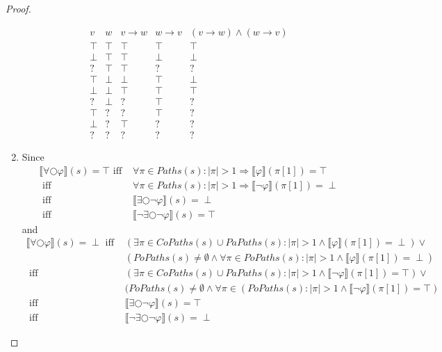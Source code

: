 \documentclass[12pt]{article}
\newcommand{\nxt}{\bigcirc}
\theoremstyle{definition}
\newcommand{\satisfaction}[1]{\llbracket #1 \rrbracket}
\begin{document}
\begin{proof}
\begin{enumerate}
\[
\begin{array}{ll|ll|l}
v     & w     & v \rightarrow w & w \rightarrow v & (v \rightarrow w) \wedge (w \rightarrow v)\\\hline
\top  & \top  & \top  & \top  & \top\\
\perp & \top  & \top  & \perp & \perp\\
?     & \top  & \top  & ?     & ?\\
\top  & \perp & \perp & \top  & \perp\\
\perp & \perp & \top  & \top  & \top\\
?     & \perp & ?     & \top  & ?\\
\top  & ?     & ?     & \top  & ?\\
\perp & ?     & \top  & ?     & ?\\
?     & ?     & ?     & ?     & ?
\end{array}
\]
\item
Since
\begin{align*}
\satisfaction{\forall \nxt \varphi}(s) = \top
\mbox{ iff } & \forall \pi \in \mathit{Paths}(s) : |\pi| > 1 \Rightarrow \satisfaction{\varphi}(\pi[1]) = \top\\
\mbox{ iff } & \forall \pi \in \mathit{Paths}(s) : |\pi| > 1 \Rightarrow \satisfaction{\neg \varphi}(\pi[1]) = \perp\\
\mbox{ iff } & \satisfaction{\exists \nxt \neg \varphi}(s) = \perp\\
\mbox{ iff } & \satisfaction{\neg \exists \nxt \neg \varphi}(s) = \top
\end{align*}
and
\begin{align*}
\satisfaction{\forall \nxt \varphi}(s) = \perp
\mbox{ iff } & (\exists \pi \in \mathit{CoPaths}(s) \cup \mathit{PaPaths}(s) : |\pi| > 1 \wedge \satisfaction{\varphi}(\pi[1]) = \perp) \vee\\
& (\mathit{PoPaths}(s) \not= \emptyset \wedge \forall \pi \in \mathit{PoPaths}(s) : |\pi| > 1 \wedge \satisfaction{\varphi}(\pi[1]) = \perp)\\
\mbox{ iff } & (\exists \pi \in \mathit{CoPaths}(s) \cup \mathit{PaPaths}(s) : |\pi| > 1 \wedge \satisfaction{\neg \varphi}(\pi[1]) = \top) \vee\\
& (\mathit{PoPaths}(s) \not= \emptyset \wedge \forall \pi \in (\mathit{PoPaths}(s) : |\pi| > 1 \wedge \satisfaction{\neg \varphi}(\pi[1]) = \top)\\
\mbox{ iff } & \satisfaction{\exists \nxt \neg \varphi}(s) = \top\\
\mbox{ iff } & \satisfaction{\neg \exists \nxt \neg \varphi}(s) = \perp

\end{align*}
\end{enumerate}
\end{proof}
\end{document}
